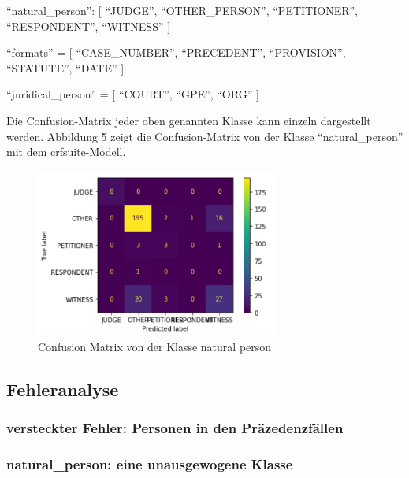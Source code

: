 \documentclass[paper=A4, ngerman, fontsize=12pt]{article}
\begin{document}
	\clearpage
	\indent
	\enquote{natural\_person}: [ \enquote{JUDGE}, \enquote{OTHER\_PERSON}, \enquote{PETITIONER}, \enquote{RESPONDENT}, \enquote{WITNESS} ]
	
	\indent
	\enquote{formats} = [ \enquote{CASE\_NUMBER}, \enquote{PRECEDENT}, \enquote{PROVISION}, \enquote{STATUTE}, \enquote{DATE} ]
	
	\indent
	\enquote{juridical\_person} = [ \enquote{COURT}, \enquote{GPE}, \enquote{ORG} ]
	
	\indent
	Die Confusion-Matrix jeder oben genannten Klasse kann einzeln dargestellt werden. Abbildung 5 zeigt die Confusion-Matrix von der Klasse \enquote{natural\_person} mit dem crfsuite-Modell. 
	
	\begin{figure}
		\begin{center}
			\includegraphics[width=8cm]{Illustrations/confusion_matrix.png}
			\caption{Confusion Matrix von der Klasse natural person}
			\label{Confusion Matrix von der Klasse natural person}
		\end{center}
	\end{figure}

	\subsection{Fehleranalyse}
	
	\subsubsection{versteckter Fehler: Personen in den Präzedenzfällen}
	
	\subsubsection{natural\_person: eine unausgewogene Klasse}
	
\end{document}

